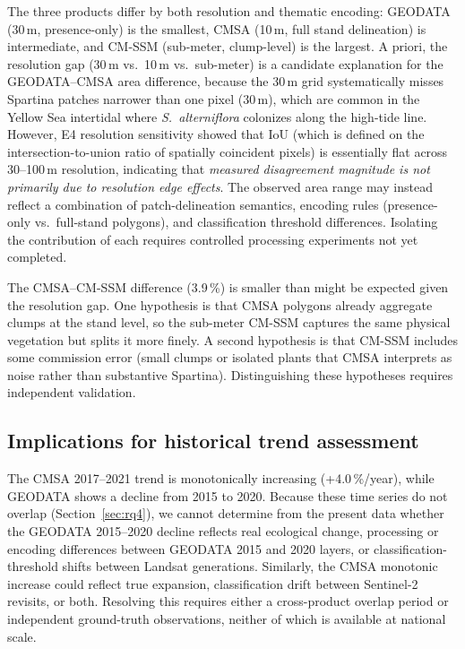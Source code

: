 \documentclass[11pt]{article}
\begin{document}
The three products differ by both resolution and thematic encoding: GEODATA
(30\,m, presence-only) is the smallest, CMSA (10\,m, full stand delineation) is
intermediate, and CM-SSM (sub-meter, clump-level) is the largest. A priori,
the resolution gap (30\,m vs.\ 10\,m vs.\ sub-meter) is a candidate explanation
for the GEODATA--CMSA area difference, because the 30\,m grid systematically
misses Spartina patches narrower than one pixel (30\,m), which are common in
the Yellow Sea intertidal where \textit{S.~alterniflora} colonizes along the
high-tide line. However, E4 resolution sensitivity showed that IoU (which is
defined on the intersection-to-union ratio of spatially coincident pixels) is
essentially flat across 30--100\,m resolution, indicating that \emph{measured
disagreement magnitude is not primarily due to resolution edge effects}.
The observed area range may instead reflect a combination of patch-delineation
semantics, encoding rules (presence-only vs.\ full-stand polygons), and
classification threshold differences. Isolating the contribution of each
requires controlled processing experiments not yet completed.

The CMSA--CM-SSM difference (3.9\,\%) is smaller than might be expected given
the resolution gap. One hypothesis is that CMSA polygons already aggregate
clumps at the stand level, so the sub-meter CM-SSM captures the same physical
vegetation but splits it more finely. A second hypothesis is that CM-SSM
includes some commission error (small clumps or isolated plants that CMSA
interprets as noise rather than substantive Spartina). Distinguishing these
hypotheses requires independent validation.

\subsection{Implications for historical trend assessment}

The CMSA 2017--2021 trend is monotonically increasing (+4.0\,\%/year), while
GEODATA shows a decline from 2015 to 2020. Because these time series do not
overlap (Section~\ref{sec:rq4}), we cannot determine from the present data
whether the GEODATA 2015--2020 decline reflects real ecological change,
processing or encoding differences between GEODATA 2015 and 2020 layers, or
classification-threshold shifts between Landsat generations. Similarly, the
CMSA monotonic increase could reflect true expansion, classification drift
between Sentinel-2 revisits, or both. Resolving this requires either a
cross-product overlap period or independent ground-truth observations, neither
of which is available at national scale.
\end{document}
